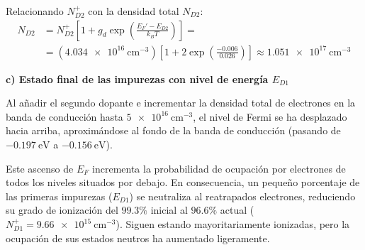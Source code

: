 \begin{problema}
Relacionando $N_{D2}^+$ con la densidad total $N_{D2}$:
\[
\begin{array}{rl}
    \displaystyle N_{D2} & \displaystyle = N_{D2}^+ \left[ 1 + g_d \exp\left( \frac{E_F' - E_{D2}}{k_B T} \right) \right] = \\[8pt]
     & \displaystyle = (\SI{4.034e16}{\cm^{-3}}) \left[ 1 + 2 \exp\left( \frac{-0.006}{0.026} \right) \right] \approx \SI{1.051e17}{\cm^{-3}}
\end{array}
\]

\textbf{c) Estado final de las impurezas con nivel de energía $E_{D1}$}

Al añadir el segundo dopante e incrementar la densidad total de electrones en la banda de conducción hasta $\SI{5e16}{\cm^{-3}}$, el nivel de Fermi se ha desplazado hacia arriba, aproximándose al fondo de la banda de conducción (pasando de $\SI{-0.197}{\eV}$ a $\SI{-0.156}{\eV}$).

Este ascenso de $E_F$ incrementa la probabilidad de ocupación por electrones de todos los niveles situados por debajo. En consecuencia, un pequeño porcentaje de las primeras impurezas ($E_{D1}$) se neutraliza al reatrapados electrones, reduciendo su grado de ionización del $99.3\%$ inicial al $96.6\%$ actual ($N_{D1}^+ = \SI{9.66e15}{\cm^{-3}}$). Siguen estando mayoritariamente ionizadas, pero la ocupación de sus estados neutros ha aumentado ligeramente.
\end{problema}


\newpage
\newpage

\newpage
